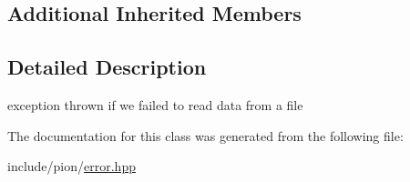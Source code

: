 \subsection*{Additional Inherited Members}


\subsection{Detailed Description}
exception thrown if we failed to read data from a file 

The documentation for this class was generated from the following file\-:\begin{DoxyCompactItemize}
\item 
include/pion/\hyperlink{error_8hpp}{error.\-hpp}\end{DoxyCompactItemize}

